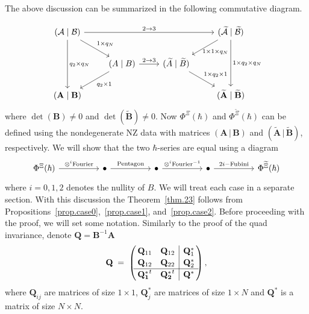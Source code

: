 \documentclass[12pt,reqno]{amsart}
\theoremstyle{definition}
\def\be{\begin{equation}}
\def\ee{\end{equation}}
\def\mbfQ{\mathbf Q}
\newcommand{\bea}{\begin{equation}\begin{aligned}}
\newcommand{\eea}{\end{aligned}\end{equation}}
\renewcommand{\=}{\;=\;}
\begin{document}
The above discussion can be summarized in the following commutative diagram.

\be
\begin{tikzcd}
(\mathcal{A}\;|\;\mathcal{B})
\arrow[rrr,"2 \to 3"]\arrow[rd,"1 \times q_N"]\arrow[dd,"q_2 \times q_N"] &  &
& (\widetilde{\mathcal{A}}\;|\;\widetilde{\mathcal{B}})
\arrow[dl,"\!\!\!\!1 \times 1 \times q_N"]\arrow[dd,"1 \times q_2 \times q_N"]\\
& (A\;|\;B)\arrow[r,"2 \to 3"]\arrow[dl,"q_2 \times 1"]
& (\widetilde{A}\;|\;\widetilde{B})\arrow[dr,"1 \times q_2 \times 1"] & \\
(\mathbf{A}\;|\;\mathbf{B}) &   &
& (\widetilde{\mathbf{A}}\;|\;\widetilde{\mathbf{B}})
\end{tikzcd}
\ee
where $\det(\mathbf{B}) \neq 0$ and $\det(\widetilde{\mathbf{B}}) \neq 0$.
Now $\Phi^\Xi(\hbar)$ and $\Phi^{\widetilde\Xi}(\hbar)$ can be defined using 
the nondegenerate NZ data with matrices $(\mathbf{A} \,|\,\mathbf{B})$ and 
$(\widetilde{\mathbf{A}} \,|\,\widetilde{\mathbf{B}})$, respectively. 
We will show that the two $\hbar$-series are equal using a diagram
\be
\label{2Phi}
\begin{tikzcd}
\Phi^\Xi(\hbar)\arrow[rr,"\otimes^i \text{Fourier}"] & & \bullet
\arrow[rr,"\text{Pentagon}"] & & \bullet
\arrow[rr,"\otimes^i \text{Fourier}^{-1}"] & & \bullet
\arrow[rr,"2i-\text{Fubini}"] & & \Phi^{\widetilde\Xi}(\hbar)
\end{tikzcd}
\ee
where $i=0,1,2$ denotes the nullity of $B$. We will treat each case in a separate
section. With this discussion the Theorem~\ref{thm.23} follows from
Propositions~\ref{prop.case0},~\ref{prop.case1}, and~\ref{prop.case2}.
Before proceeding with the proof, we will set some
notation. Similarly to the proof of the quad invariance, denote
$\mbfQ=\mathbf{B}^{-1}\mathbf{A}$
\bea
\label{eq:BinvA_def}
\mathbf Q \=
\def\arraystretch{1.15}
\left(\!\!
\begin{array}{cc|c}
\mathbf Q_{11} & \mathbf Q_{12} & \mathbf Q_1^*\\
\mathbf Q_{12} & \mathbf Q_{22} & \mathbf Q_2^*\\
\hline
\mathbf {Q_1^*}^t & \mathbf {Q_2^*}^t & \mathbf Q^*\\
\end{array}\!\!\right),
\eea
where $\mbfQ_{ij}$ are matrices of size $1\times 1$, $\mbfQ_{j}^{*}$
are matrices of size $1\times N$ and $\mbfQ^{*}$ is a matrix of size
$N\times N$.
\end{document}
